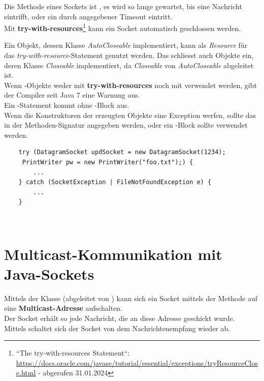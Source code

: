\noindent
Die Methode  eines Sockets ist , es wird so lange gewartet, bis eine Nachricht eintrifft, oder ein durch  angegebener Timeout eintritt.\\

\noindent
Mit \textbf{try-with-resources}\footnote{
    ``The try-with-resources Statement``: \url{https://docs.oracle.com/javase/tutorial/essential/exceptions/tryResourceClose.html} - abgerufen 31.01.2024
} kann ein Socket automatisch geschlossen werden.

\begin{tcolorbox}
Ein Objekt, dessen Klasse \textit{AutoCloseable} implementiert, kann als \textit{Resource} für das \textit{try-with-resource}-Statement genutzt werden.
Das schliesst auch Objekte ein, deren Klasse \textit{Closeable} implementiert, da \textit{Closeable} von \textit{AutoCloseable} abgeleitet ist.\\

\noindent
Wenn -Objekte weder mit \textbf{try-with-resources} noch mit  verwendet werden, gibt der Compiler seit Java 7 eine Warnung aus.\\

\noindent
Ein -Statement kommt ohne -Block aus.\\
Wenn die Konstruktoren der erzeugten Objekte eine Exception werfen, sollte das in der Methoden-Signatur angegeben werden, oder ein -Block sollte verwendet werden.
\end{tcolorbox}

\begin{verbatim}
    try (DatagramSocket updSocket = new DatagramSocket(1234);
     PrintWriter pw = new PrintWriter("foo.txt");) {
        ...
    } catch (SocketException | FileNotFoundException e) {
        ...
    }
\end{verbatim}\\

\section{Multicast-Kommunikation mit Java-Sockets}
Mittels der Klasse  (abgeleitet von ) kann sich ein Socket mittels der Methode  auf eine \textbf{Multicast-Adresse} aufschalten.\\
Der Socket erhält so jede Nachricht, die an diese Adresse geschickt wurde.\\
Mittels  schaltet sich der Socket von dem Nachrichtenempfang wieder ab.\\

